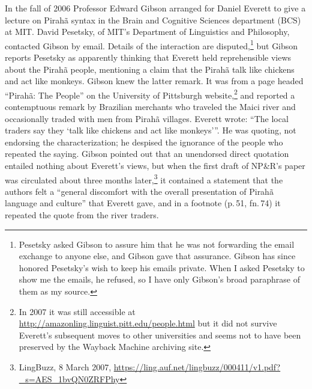 \documentclass[output=paper,colorlinks,citecolor=brown
]{langscibook}
\begin{document}
In the fall of 2006 Professor Edward Gibson arranged for Daniel
Everett to give a lecture on Pirah{\~a} syntax in the Brain and
Cognitive Sciences department (BCS) at MIT. David Pesetsky, of MIT's
Department of Linguistics and Philosophy, contacted Gibson by email.
Details of the interaction are disputed,\footnote{\label{gibson}
   Pesetsky asked Gibson to assure him that he was not forwarding the
   email exchange to anyone else, and Gibson gave that assurance.
   Gibson has since honored Pesetsky's wish to keep his emails private.
   When I asked Pesetsky to show me the emails, he refused, so I have
   only Gibson's broad paraphrase of them as my source.}
but Gibson reports Pesetsky as apparently thinking that Everett held
reprehensible views about the Pirah{\~a} people, mentioning a claim
that the Pirah{\~a} talk like chickens and act like monkeys.
Gibson knew the latter remark.  It was from a page headed
``Pirah{\~a}: The People'' on the University of Pittsburgh
website,\footnote{\label{pittsburgh}
  In 2007 it was still accessible at
  \url{http://amazonling.linguist.pitt.edu/people.html} but it did
  not survive Everett's subsequent moves to other universities and
  seems not to have been preserved by the Wayback Machine archiving
  site.}
and reported a contemptuous remark by Brazilian merchants who traveled
the Maici river and occasionally traded with men from Pirah{\~a}
villages. Everett wrote: ``The local traders say they `talk
like chickens and act like monkeys'''. He was quoting, not endorsing
the characterization; he despised the ignorance of the people who
repeated the saying. Gibson pointed out that an unendorsed direct
quotation entailed nothing about Everett's views, but when the first
draft of NP\&R's paper was circulated about three months
later,\footnote{\label{firstrelease}
   LingBuzz, 8 March 2007,
   \url{https://ling.auf.net/lingbuzz/000411/v1.pdf?_s=AES_1bvQN0ZRFPhy}}
it contained a statement that the authors felt a ``general discomfort
with the overall presentation of Pirahã language and culture'' that
Everett gave, and in a footnote (p.\,51, fn.\,74) it repeated the
quote from the river traders.
\end{document}
